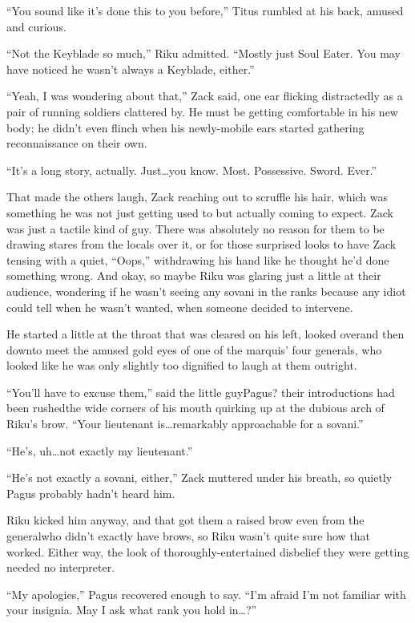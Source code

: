 ``You sound like it's done this to you before,'' Titus rumbled at his back, amused and curious.

``Not the Keyblade so much,'' Riku admitted. ``Mostly just Soul Eater. You may have noticed he wasn't always a Keyblade, either.''

``Yeah, I was wondering about that,'' Zack said, one ear flicking distractedly as a pair of running soldiers clattered by. He must be getting comfortable in his new body; he didn't even flinch when his newly-mobile ears started gathering reconnaissance on their own.

``It's a long story, actually. Just\ldots you know. Most. Possessive. Sword. Ever.''

That made the others laugh, Zack reaching out to scruffle his hair, which was something he was not just getting used to but actually coming to expect. Zack was just a tactile kind of guy. There was absolutely no reason for them to be drawing stares from the locals over it, or for those surprised looks to have Zack tensing with a quiet, ``Oops,'' withdrawing his hand like he thought he'd done something wrong. And okay, so maybe Riku was glaring just a little at their audience, wondering if he wasn't seeing any sovani in the ranks because any idiot could tell when he wasn't wanted, when someone decided to intervene.

He started a little at the throat that was cleared on his left, looked over\textemdash and then down\textemdash to meet the amused gold eyes of one of the marquis' four generals, who looked like he was only slightly too dignified to laugh at them outright.

``You'll have to excuse them,'' said the little guy\textemdash Pagus? their introductions had been rushed\textemdash the wide corners of his mouth quirking up at the dubious arch of Riku's brow. ``Your lieutenant is\ldots remarkably approachable for a sovani.''

``He's, uh\ldots not exactly my lieutenant.''

``He's not exactly a sovani, either,'' Zack muttered under his breath, so quietly Pagus probably hadn't heard him.

Riku kicked him anyway, and that got them a raised brow even from the general\textemdash who didn't exactly have brows, so Riku wasn't quite sure how that worked. Either way, the look of thoroughly-entertained disbelief they were getting needed no interpreter.

``My apologies,'' Pagus recovered enough to say. ``I'm afraid I'm not familiar with your insignia. May I ask what rank you hold in\ldots ?''

